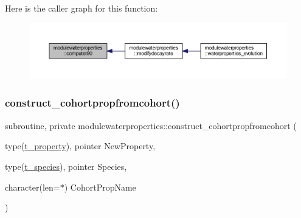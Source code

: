 Here is the caller graph for this function\+:\nopagebreak
\begin{figure}[H]
\begin{center}
\leavevmode
\includegraphics[width=350pt]{namespacemodulewaterproperties_a5dbf64b0ab9b6e7fc74c9425dd2e5801_icgraph}
\end{center}
\end{figure}
\mbox{\label{namespacemodulewaterproperties_ae1c5c0deae03ce719a2b777bc86fb00f}} 
\subsubsection{\texorpdfstring{construct\+\_\+cohortpropfromcohort()}{construct\_cohortpropfromcohort()}}
{\footnotesize\ttfamily subroutine, private modulewaterproperties\+::construct\+\_\+cohortpropfromcohort (\begin{DoxyParamCaption}\item[{type(\mbox{\hyperlink{structmodulewaterproperties_1_1t__property}{t\+\_\+property}}), pointer}]{New\+Property,  }\item[{type(\mbox{\hyperlink{structmodulewaterproperties_1_1t__species}{t\+\_\+species}}), pointer}]{Species,  }\item[{character(len=$\ast$)}]{Cohort\+Prop\+Name }\end{DoxyParamCaption})\hspace{0.3cm}{\ttfamily [private]}}

